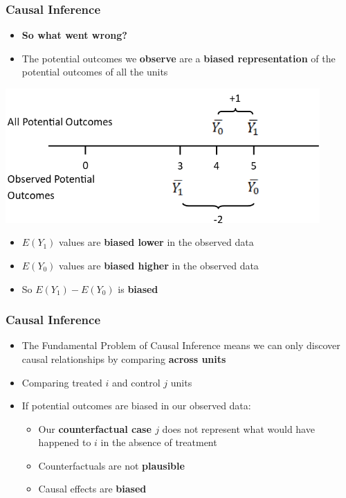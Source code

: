 \documentclass[xcolor=x11names,compress]{beamer}\usepackage[]{graphicx}\usepackage[]{color}
\renewcommand{\(}{\begin{columns}}
\renewcommand{\)}{\end{columns}}
\newcommand{\<}[1]{\begin{column}{#1}}
\renewcommand{\>}{\end{column}}
\begin{document}
\begin{frame}
\frametitle{Causal Inference}
\begin{itemize}
\item \textbf{So what went wrong?}
\item The potential outcomes we \textbf{observe} are a \textbf{biased representation} of the potential outcomes of all the units
\end{itemize}
\includegraphics[width=0.9\textwidth]{PO_number_line_2.png}
\begin{itemize}
\item $E(Y_1)$ values are \textbf{biased lower} in the observed data
\pause
\item $E(Y_0)$ values are \textbf{biased higher} in the observed data
\pause
\item So $E(Y_1)-E(Y_0)$ is \textbf{biased}
\end{itemize}
\end{frame}

\begin{frame}
\frametitle{Causal Inference}
\begin{itemize}
\item The Fundamental Problem of Causal Inference means we can only discover causal relationships by comparing \textbf{across units}
\pause
\item Comparing treated $i$ and control $j$ units
\pause
\item If potential outcomes are biased in our observed data:
\pause
\begin{itemize}
\item Our \textbf{counterfactual case $j$} does not represent what would have happened to $i$ in the absence of treatment
\pause
\item Counterfactuals are not \textbf{plausible}
\pause
\item Causal effects are \textbf{biased}
\end{itemize}
\end{itemize}
\end{frame}
\end{document}
